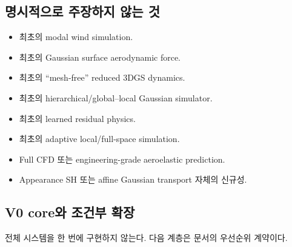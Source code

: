 \documentclass[11pt,a4paper]{article}
\begin{document}
\subsection{명시적으로 주장하지 않는 것}

\begin{itemize}[leftmargin=1.5em]
  \item 최초의 modal wind simulation.
  \item 최초의 Gaussian surface aerodynamic force.
  \item 최초의 ``mesh-free'' reduced 3DGS dynamics.
  \item 최초의 hierarchical/global--local Gaussian simulator.
  \item 최초의 learned residual physics.
  \item 최초의 adaptive local/full-space simulation.
  \item Full CFD 또는 engineering-grade aeroelastic prediction.
  \item Appearance SH 또는 affine Gaussian transport 자체의 신규성.
\end{itemize}

\subsection{V0 core와 조건부 확장}

전체 시스템을 한 번에 구현하지 않는다. 다음 계층은 문서의 우선순위 계약이다.
\end{document}
